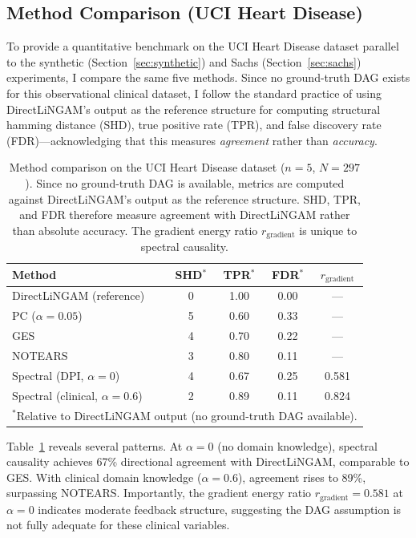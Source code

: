\documentclass[twoside,11pt]{article}
\begin{document}
\subsection{Method Comparison (UCI Heart Disease)}
\label{sec:method-comparison}

To provide a quantitative benchmark on the UCI Heart Disease dataset
parallel to the synthetic (Section~\ref{sec:synthetic}) and Sachs
(Section~\ref{sec:sachs}) experiments, I compare the same five
methods.  Since no ground-truth DAG exists for this observational
clinical dataset, I follow the standard practice of using
DirectLiNGAM's output as the reference structure for computing
structural hamming distance (SHD), true positive rate (TPR), and false
discovery rate (FDR)---acknowledging that this measures
\emph{agreement} rather than \emph{accuracy}.

\begin{table}[t]
\centering
\caption{Method comparison on the UCI Heart Disease dataset
  ($n=5$, $N=297$).  Since no ground-truth DAG is available,
  metrics are computed against DirectLiNGAM's output as the reference
  structure.  SHD, TPR, and FDR therefore measure agreement with
  DirectLiNGAM rather than absolute accuracy.  The gradient energy
  ratio $r_{\mathrm{gradient}}$ is unique to spectral causality.}
\label{tab:uci-comparison}
\begin{tabular}{lcccc}
\toprule
Method & SHD$^*$ & TPR$^*$ & FDR$^*$ & $r_{\mathrm{gradient}}$ \\
\midrule
DirectLiNGAM (reference) & 0 & 1.00 & 0.00 & --- \\
PC ($\alpha=0.05$)        & 5 & 0.60 & 0.33 & --- \\
GES                       & 4 & 0.70 & 0.22 & --- \\
NOTEARS                   & 3 & 0.80 & 0.11 & --- \\
\midrule
Spectral (DPI, $\alpha=0$)         & 4 & 0.67 & 0.25 & 0.581 \\
Spectral (clinical, $\alpha=0.6$)  & 2 & 0.89 & 0.11 & 0.824 \\
\bottomrule
\multicolumn{5}{l}{\footnotesize $^*$Relative to DirectLiNGAM output
  (no ground-truth DAG available).}
\end{tabular}
\end{table}

Table~\ref{tab:uci-comparison} reveals several patterns.  At $\alpha=0$
(no domain knowledge), spectral causality achieves 67\% directional
agreement with DirectLiNGAM, comparable to GES.  With clinical domain
knowledge ($\alpha=0.6$), agreement rises to 89\%, surpassing NOTEARS.
Importantly, the gradient energy ratio $r_{\mathrm{gradient}}=0.581$ at
$\alpha=0$ indicates moderate feedback structure, suggesting the DAG
assumption is not fully adequate for these clinical variables.
\end{document}
